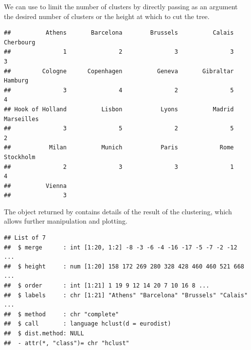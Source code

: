 \documentclass[krantz2]{krantz}\usepackage{knitr}
\begin{document}
We can use  to limit the number of clusters by directly passing as an argument the desired number of clusters or the height at which to cut the tree.

\begin{knitrout}\footnotesize
{}\color{fgcolor}\begin{kframe}
\begin{alltt}
  \hlstd{=} \hlstd{)}
\end{alltt}
\begin{verbatim}
##          Athens       Barcelona        Brussels          Calais       Cherbourg
##               1               2               3               3               3
##         Cologne      Copenhagen          Geneva       Gibraltar         Hamburg
##               3               4               2               5               4
## Hook of Holland          Lisbon           Lyons          Madrid      Marseilles
##               3               5               2               5               2
##           Milan          Munich           Paris            Rome       Stockholm
##               2               3               3               1               4
##          Vienna
##               3
\end{verbatim}
\end{kframe}
\end{knitrout}

The object returned by  contains details of the result of the clustering, which allows further manipulation and plotting.
\begin{knitrout}\footnotesize
{}\color{fgcolor}\begin{kframe}
\begin{alltt}
\end{alltt}
\begin{verbatim}
## List of 7
##  $ merge      : int [1:20, 1:2] -8 -3 -6 -4 -16 -17 -5 -7 -2 -12 ...
##  $ height     : num [1:20] 158 172 269 280 328 428 460 460 521 668 ...
##  $ order      : int [1:21] 1 19 9 12 14 20 7 10 16 8 ...
##  $ labels     : chr [1:21] "Athens" "Barcelona" "Brussels" "Calais" ...
##  $ method     : chr "complete"
##  $ call       : language hclust(d = eurodist)
##  $ dist.method: NULL
##  - attr(*, "class")= chr "hclust"
\end{verbatim}
\end{kframe}
\end{knitrout}
\end{document}

